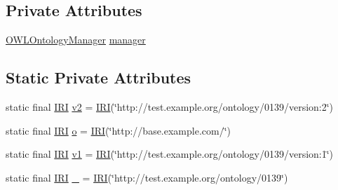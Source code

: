 \subsection*{Private Attributes}
\begin{DoxyCompactItemize}
\item 
\hyperlink{interfaceorg_1_1semanticweb_1_1owlapi_1_1model_1_1_o_w_l_ontology_manager}{O\-W\-L\-Ontology\-Manager} \hyperlink{classorg_1_1semanticweb_1_1owlapi_1_1api_1_1test_1_1ontology_1_1_multiple_ontology_loads_test_case_a4cd6438f190c5600a43f7f392b19c748}{manager}
\end{DoxyCompactItemize}
\subsection*{Static Private Attributes}
\begin{DoxyCompactItemize}
\item 
static final \hyperlink{classorg_1_1semanticweb_1_1owlapi_1_1model_1_1_i_r_i}{I\-R\-I} \hyperlink{classorg_1_1semanticweb_1_1owlapi_1_1api_1_1test_1_1ontology_1_1_multiple_ontology_loads_test_case_a23e64b1f4eba4e669fc28265be67efad}{v2} = \hyperlink{classorg_1_1semanticweb_1_1owlapi_1_1model_1_1_i_r_i}{I\-R\-I}(\char`\"{}http\-://test.\-example.\-org/ontology/0139/version\-:2\char`\"{})
\item 
static final \hyperlink{classorg_1_1semanticweb_1_1owlapi_1_1model_1_1_i_r_i}{I\-R\-I} \hyperlink{classorg_1_1semanticweb_1_1owlapi_1_1api_1_1test_1_1ontology_1_1_multiple_ontology_loads_test_case_a10c1f397abefc73e3a8112666feac913}{o} = \hyperlink{classorg_1_1semanticweb_1_1owlapi_1_1model_1_1_i_r_i}{I\-R\-I}(\char`\"{}http\-://base.\-example.\-com/\char`\"{})
\item 
static final \hyperlink{classorg_1_1semanticweb_1_1owlapi_1_1model_1_1_i_r_i}{I\-R\-I} \hyperlink{classorg_1_1semanticweb_1_1owlapi_1_1api_1_1test_1_1ontology_1_1_multiple_ontology_loads_test_case_abe748533c514a2b48719bf6d3b438663}{v1} = \hyperlink{classorg_1_1semanticweb_1_1owlapi_1_1model_1_1_i_r_i}{I\-R\-I}(\char`\"{}http\-://test.\-example.\-org/ontology/0139/version\-:1\char`\"{})
\item 
static final \hyperlink{classorg_1_1semanticweb_1_1owlapi_1_1model_1_1_i_r_i}{I\-R\-I} \hyperlink{classorg_1_1semanticweb_1_1owlapi_1_1api_1_1test_1_1ontology_1_1_multiple_ontology_loads_test_case_ad72e654a2a20fafc41798d1b1f0f05a7}{\-\_} = \hyperlink{classorg_1_1semanticweb_1_1owlapi_1_1model_1_1_i_r_i}{I\-R\-I}(\char`\"{}http\-://test.\-example.\-org/ontology/0139\char`\"{})
\end{DoxyCompactItemize}


